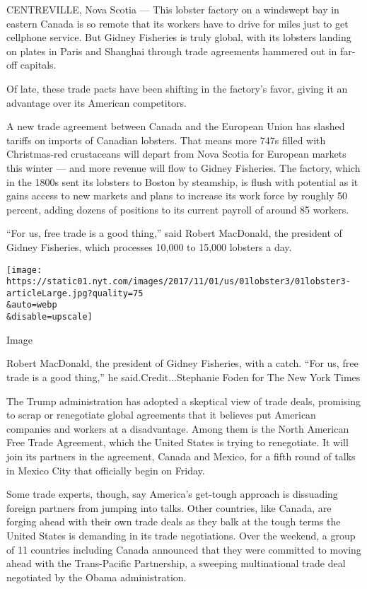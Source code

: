 CENTREVILLE, Nova Scotia --- This lobster factory on a windswept bay in
eastern Canada is so remote that its workers have to drive for miles
just to get cellphone service. But Gidney Fisheries is truly global,
with its lobsters landing on plates in Paris and Shanghai through trade
agreements hammered out in far-off capitals.

Of late, these trade pacts have been shifting in the factory's favor,
giving it an advantage over its American competitors.

A new trade agreement between Canada and the European Union has slashed
tariffs on imports of Canadian lobsters. That means more 747s filled
with Christmas-red crustaceans will depart from Nova Scotia for European
markets this winter --- and more revenue will flow to Gidney Fisheries.
The factory, which in the 1800s sent its lobsters to Boston by
steamship, is flush with potential as it gains access to new markets and
plans to increase its work force by roughly 50 percent, adding dozens of
positions to its current payroll of around 85 workers.

``For us, free trade is a good thing,'' said Robert MacDonald, the
president of Gidney Fisheries, which processes 10,000 to 15,000 lobsters
a day.

\texttt{[image: https://static01.nyt.com/images/2017/11/01/us/01lobster3/01lobster3-articleLarge.jpg?quality=75\\\&auto=webp\\\&disable=upscale]}

Image

Robert MacDonald, the president of Gidney Fisheries, with a catch. ``For
us, free trade is a good thing,'' he said.Credit...Stephanie Foden for
The New York Times

The Trump administration has adopted a skeptical view of trade deals,
promising to scrap or renegotiate global agreements that it believes put
American companies and workers at a disadvantage. Among them is the
North American Free Trade Agreement, which the United States is trying
to renegotiate. It will join its partners in the agreement, Canada and
Mexico, for a fifth round of talks in Mexico City that officially begin
on Friday.

Some trade experts, though, say America's get-tough approach is
dissuading foreign partners from jumping into talks. Other countries,
like Canada, are forging ahead with their own trade deals as they balk
at the tough terms the United States is demanding in its trade
negotiations. Over the weekend, a group of 11 countries including Canada
announced that they were committed to moving ahead with the
Trans-Pacific Partnership, a sweeping multinational trade deal
negotiated by the Obama administration.

